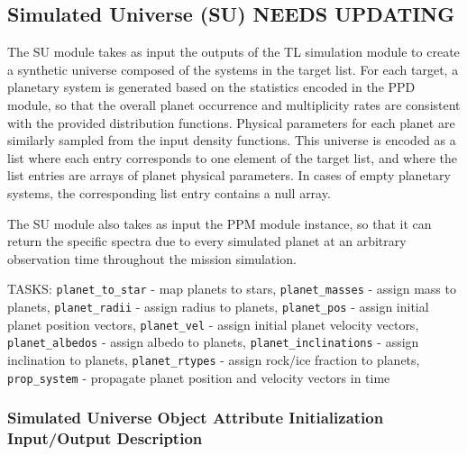\documentclass[cleanfoot]{asme2ej}
\begin{document}

\subsection{Simulated Universe (SU) NEEDS UPDATING}
The SU module takes as input the outputs of the TL simulation module to create a synthetic universe composed of the systems in the target list.  For each target, a planetary system is generated based on the statistics encoded in the PPD module, so that the overall planet occurrence and multiplicity rates are consistent with the provided distribution functions.  Physical parameters for each planet are similarly sampled from the input density functions.  This universe is encoded as a list where each entry corresponds to one element of the target list, and where the list entries are arrays of planet physical parameters.  In cases of empty planetary systems, the corresponding list entry contains a null array.

The SU module also takes as input the PPM module instance, so that it can return the specific spectra due to every simulated planet at an arbitrary observation time throughout the mission simulation.

TASKS: \verb+planet_to_star+ - map planets to stars, \verb+planet_masses+ - assign mass to planets, \verb+planet_radii+ - assign radius to planets, \verb+planet_pos+ - assign initial planet position vectors, \verb+planet_vel+ - assign initial planet velocity vectors, \verb+planet_albedos+ - assign albedo to planets, \verb+planet_inclinations+ - assign inclination to planets, \verb+planet_rtypes+ - assign rock/ice fraction to planets, \verb+prop_system+ - propagate planet position and velocity vectors in time

\label{sec:simulateduniverse}
\subsubsection{Simulated Universe Object Attribute Initialization Input/Output Description}
\end{document}
